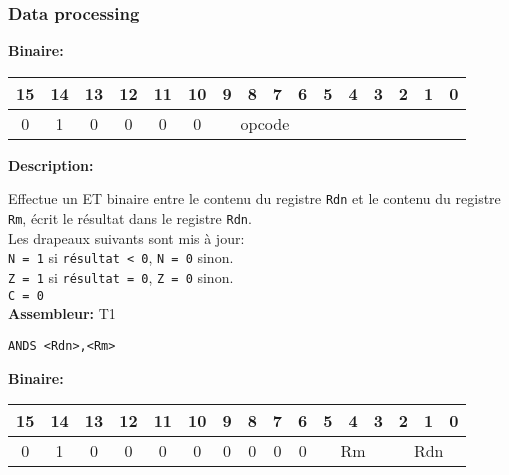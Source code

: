 \documentclass{article}
\begin{document}
    \subsubsection{Data processing}
    \label{subsubsec:DataProc}

    \textbf{Binaire:}

    \begin{tabular}{| c c c c c c c c c c c c c c c c |}
        \hline
        15 & 14 & 13 & 12 & 11 & 10 & \multicolumn{1}{|c}{9} & 8 & 7 & 6 & \multicolumn{1}{|c}{5} & 4 & 3 & 2 & 1 & 0 \\
        \hline
        0 & 1 & 0 & 0 & 0 & 0 & \multicolumn{4}{|c}{opcode} & \multicolumn{6}{|c|}{} \\
        \hline
    \end{tabular}


    \textbf{Description: }

    Effectue un ET binaire entre le contenu du registre \texttt{Rdn} et le contenu du registre \texttt{Rm}, écrit le résultat dans le registre \texttt{Rdn}.\\
    Les drapeaux suivants sont mis à jour:\\
    \texttt{N = 1} si \texttt{résultat < 0}, \texttt{N = 0} sinon.\\
    \texttt{Z = 1} si \texttt{résultat = 0}, \texttt{Z = 0} sinon.\\
    \texttt{C = 0}\\

    \textbf{Assembleur:} T1

    \begin{lstlisting}
ANDS <Rdn>,<Rm>
    \end{lstlisting}

    \textbf{Binaire:}

    \begin{tabular}{| c c c c c c c c c c c c c c c c |}
        \hline
        15 & 14 & 13 & 12 & 11 & 10 & \multicolumn{1}{|c}{9} & 8 & 7 & 6 & \multicolumn{1}{|c}{5} & 4 & 3 & \multicolumn{1}{|c}{2} & 1 & 0 \\
        \hline
        0 & 1 & 0 & 0 & 0 & 0 & \multicolumn{1}{|c}{0} & 0 & 0 & 0 & \multicolumn{3}{|c}{Rm} & \multicolumn{3}{|c|}{Rdn} \\
        \hline
    \end{tabular}


\end{document}
